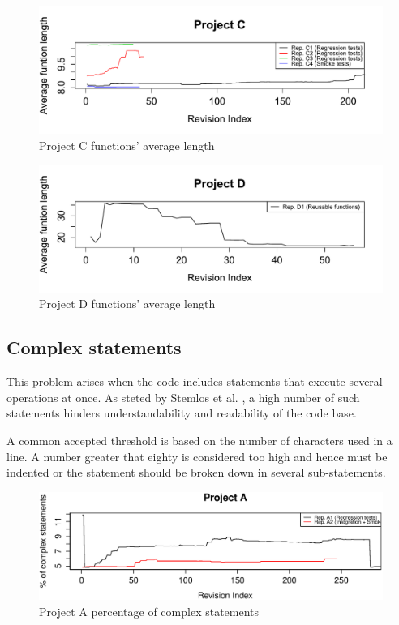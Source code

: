 \begin{figure}[!htbp]
    \centering
    \includegraphics[width=\textwidth,keepaspectratio]{figure/results/rq1/avg_length_project_c.pdf}
    \caption{Project C  functions' average length}
    \label{fig:avg_length_project_c}
\end{figure}

\begin{figure}[!htbp]
    \centering
    \includegraphics[width=\textwidth,keepaspectratio]{figure/results/rq1/avg_length_project_d.pdf}
    \caption{Project D  functions' average length}
    \label{fig:avg_length_project_d}
\end{figure}




\subsection{Complex statements}
This problem arises when the code includes statements that execute several operations at once. As steted by Stemlos et al. \cite{metrics_source_code}, a high number of such statements hinders understandability and readability of the code base.

A common accepted threshold is based on the number of characters used in a line. A number greater that eighty is considered too high and hence must be indented or the statement should be broken down in several sub-statements.

\begin{figure}[!htbp]
    \centering
    \includegraphics[width=\textwidth]{figure/results/rq1/statement_complexity_project_a.eps}
    \caption{Project A percentage of complex statements}
    \label{fig:statement_complexity_project_a}
\end{figure}

